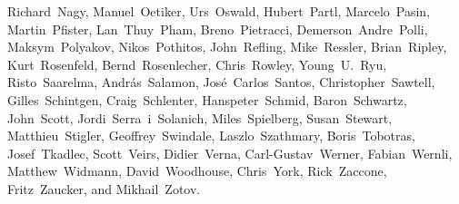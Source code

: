 \begin{flushleft}
Richard~Nagy,           %
Manuel~Oetiker,         %
Urs~Oswald,             %
Hubert~Partl,           %
Marcelo~Pasin,          %
Martin~Pfister,		%
Lan~Thuy~Pham,          %
Breno~Pietracci,        %
Demerson~Andre~Polli,   %
Maksym~Polyakov,        %
Nikos~Pothitos,		%
John~Refling,           %
Mike~Ressler,           %
Brian~Ripley,           %
Kurt~Rosenfeld,		%
Bernd~Rosenlecher,      %
Chris~Rowley,           %
Young~U.~Ryu,           %
Risto~Saarelma,         %
Andr{\'a}s~Salamon,     %
Jos\'e~Carlos~Santos,   %
Christopher~Sawtell,    %
Gilles~Schintgen,       %
Craig~Schlenter,        %
Hanspeter~Schmid,       %
Baron~Schwartz,         %
John~Scott,             %
Jordi~Serra~i~Solanich, %
Miles~Spielberg,        %
Susan~Stewart,
Matthieu~Stigler,
Geoffrey~Swindale,      %
Laszlo~Szathmary,       %
Boris~Tobotras,         %
Josef~Tkadlec,          %
Scott~Veirs,            %
Didier~Verna,           %
Carl-Gustav~Werner,     %
Fabian~Wernli,          %
Matthew~Widmann,        %
David~Woodhouse,        %
Chris~York,             %
Rick~Zaccone,           %
Fritz~Zaucker,          %
and Mikhail~Zotov.      %
\end{flushleft}


\pagebreak
\endinput
%

